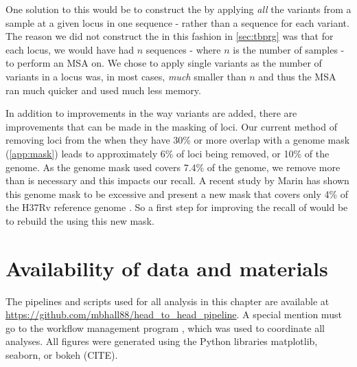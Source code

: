 One solution to this would be to construct the \prg{} by applying \emph{all} the variants from a sample at a given locus in one sequence - rather than a sequence for each variant. The reason we did not construct the \prg{} in this fashion in \autoref{sec:tbprg} was that for each locus, we would have had $n$ sequences - where $n$ is the number of samples - to perform an MSA on. We chose to apply single variants as the number of variants in a locus was, in most cases, \emph{much} smaller than $n$ and thus the MSA ran much quicker and used much less memory.

In addition to improvements in the way variants are added, there are improvements that can be made in the masking of loci. Our current method of removing loci from the \prg{} when they have 30\% or more overlap with a genome mask (\autoref{app:mask}) leads to approximately 6\% of loci being removed, or 10\% of the genome. As the genome mask used covers 7.4\% of the genome, we remove more than is necessary and this impacts our recall. A recent study by Marin \etal{} has shown this genome mask to be excessive and present a new mask that covers only 4\% of the H37Rv reference genome \cite{marin2021}. So a first step for improving the recall of \pandora{} would be to rebuild the \prg{} using this new mask.


\section{Availability of data and materials}

The pipelines and scripts used for all analysis in this chapter are available at \url{https://github.com/mbhall88/head_to_head_pipeline}. A special mention must go to the workflow management program  \cite{snakemake2021}, which was used to coordinate all analyses. All figures were generated using the Python libraries matplotlib, seaborn, or bokeh (CITE).

